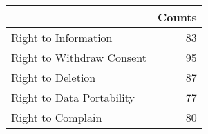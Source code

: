 \begin{tabular}{lr}
\toprule
{} &  Counts \\
\midrule
Right to Information      &      83 \\
Right to Withdraw Consent &      95 \\
Right to Deletion         &      87 \\
Right to Data Portability &      77 \\
Right to Complain         &      80 \\
\bottomrule
\end{tabular}
